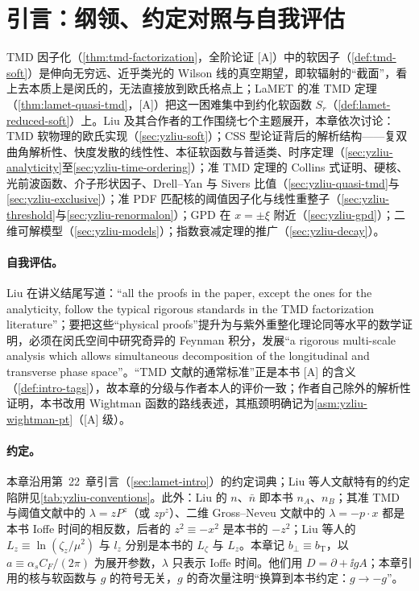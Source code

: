 \section{引言：纲领、约定对照与自我评估}\label{sec:yzliu-intro}

TMD 因子化（\cref{thm:tmd-factorization}，全阶论证 [A]）中的软因子（\cref{def:tmd-soft}）是伸向无穷远、近乎类光的 Wilson 线的真空期望，即软辐射的“截面”，看上去本质上是闵氏的，无法直接放到欧氏格点上；LaMET 的准 TMD 定理（\cref{thm:lamet-quasi-tmd}，[A]）把这一困难集中到约化软函数 $S_r$（\cref{def:lamet-reduced-soft}）上。Liu 及其合作者的工作围绕七个主题展开，本章依次讨论：TMD 软物理的欧氏实现（\cref{sec:yzliu-soft}）；CSS 型论证背后的解析结构——复双曲角解析性、快度发散的线性性、本征软函数与普适类、时序定理（\cref{sec:yzliu-analyticity}至\cref{sec:yzliu-time-ordering}）；准 TMD 定理的 Collins 式证明、硬核、光前波函数、介子形状因子、Drell--Yan 与 Sivers 比值（\cref{sec:yzliu-quasi-tmd}与\cref{sec:yzliu-exclusive}）；准 PDF 匹配核的阈值因子化与线性重整子（\cref{sec:yzliu-threshold}与\cref{sec:yzliu-renormalon}）；GPD 在 $x=\pm\xi$ 附近（\cref{sec:yzliu-gpd}）；二维可解模型（\cref{sec:yzliu-models}）；指数衰减定理的推广（\cref{sec:yzliu-decay}）。

\paragraph{自我评估。}Liu 在讲义结尾写道：“all the proofs in the paper, except the ones for the analyticity, follow the typical rigorous standards in the TMD factorization literature”\cite[第~6~节]{Liu:2022nnk}；要把这些“physical proofs”提升为与紫外重整化理论同等水平的数学证明，必须在闵氏空间中研究奇异的 Feynman 积分，发展“a rigorous multi-scale analysis which allows simultaneous decomposition of the longitudinal and transverse phase space”。“TMD 文献的通常标准”正是本书 [A] 的含义（\cref{def:intro-tags}），故本章的分级与作者本人的评价一致；作者自己除外的解析性证明，本书改用 Wightman 函数的路线表述，其瓶颈明确记为\cref{asm:yzliu-wightman-pt}（[A] 级）。

\paragraph{约定。}本章沿用第~22~章引言（\cref{sec:lamet-intro}）的约定词典；Liu 等人文献特有的约定陷阱见\cref{tab:yzliu-conventions}。此外：Liu 的 $n$、$\bar n$ 即本书 $n_A$、$n_B$；其准 TMD 与阈值文献中的 $\lambda=zP^z$（或 $zp^z$）、二维 Gross--Neveu 文献中的 $\lambda=-p\cdot x$ 都是本书 Ioffe 时间的相反数，后者的 $z^2\equiv-x^2$ 是本书的 $-z^2$；Liu 等人的 $L_z\equiv\ln(\zeta_z/\mu^2)$ 与 $l_z$ 分别是本书的 $L_\zeta$ 与 $L_z$。本章记 $b_\perp\equiv b_{\mathrm T}$，以 $a\equiv\alpha_sC_F/(2\pi)$ 为展开参数，$\lambda$ 只表示 Ioffe 时间。他们用 $D=\partial+\ii gA$；本章引用的核与软函数与 $g$ 的符号无关，$g$ 的奇次量注明“换算到本书约定：$g\to-g$”。

